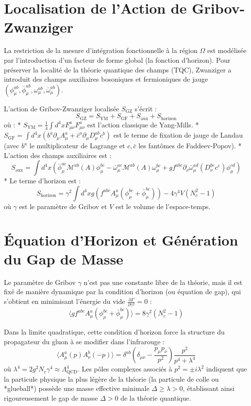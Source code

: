 \documentclass[11pt,a4paper]{article}
\begin{document}
\section{Localisation de l'Action de Gribov-Zwanziger}
La restriction de la mesure d'intégration fonctionnelle à la région $\Omega$ est modélisée par l'introduction d'un facteur de forme global (la fonction d'horizon). Pour préserver la localité de la théorie quantique des champs (TQC), Zwanziger a introduit des champs auxiliaires bosoniques et fermioniques de jauge $(\phi_\mu^{ab}, \bar{\phi}_\mu^{ab}, \omega_\mu^{ab}, \bar{\omega}_\mu^{ab})$.

L'action de Gribov-Zwanziger localisée $S_{\mathrm{GZ}}$ s'écrit :
$$ S_{\mathrm{GZ}} = S_{\mathrm{YM}} + S_{\mathrm{GF}} + S_{\mathrm{aux}} + S_{\mathrm{horizon}} $$
où :
* $S_{\mathrm{YM}} = \frac{1}{4} \int d^4x F_{\mu\nu}^a F_{\mu\nu}^a$ est l'action classique de Yang-Mills.
* $S_{\mathrm{GF}} = \int d^4x \left( b^a \partial_\mu A_\mu^a + \bar{c}^a \partial_\mu D_\mu^{ab} c^b \right)$ est le terme de fixation de jauge de Landau (avec $b^a$ le multiplicateur de Lagrange et $c, \bar{c}$ les fantômes de Faddeev-Popov).
* L'action des champs auxiliaires est :
  $$ S_{\mathrm{aux}} = \int d^4x \left( \bar{\phi}_{\mu}^{ac} \mathcal{M}^{ab}(A) \phi_{\mu}^{bc} - \bar{\omega}_{\mu}^{ac} \mathcal{M}^{ab}(A) \omega_{\mu}^{bc} + g f^{abc} \partial_\nu \bar{\omega}_{\mu}^{ad} (D_\nu^{be} c^e) \phi_{\mu}^{cd} \right) $$
* Le terme d'horizon est :
  $$ S_{\mathrm{horizon}} = \gamma^2 \int d^4x g \left( f^{abc} A_\mu^a (\phi_\mu^{bc} + \bar{\phi}_\mu^{bc}) \right) - 4\gamma^4 V (N_c^2 - 1) $$
  où $\gamma$ est le paramètre de Gribov et $V$ est le volume de l'espace-temps.

\section{Équation d'Horizon et Génération du Gap de Masse}
Le paramètre de Gribov $\gamma$ n'est pas une constante libre de la théorie, mais il est fixé de manière dynamique par la condition d'horizon (ou équation de gap), qui s'obtient en minimisant l'énergie du vide $\frac{\partial \Gamma}{\partial \gamma^2} = 0$ :
$$ \langle g f^{abc} A_\mu^a (\phi_\mu^{bc} + \bar{\phi}_\mu^{bc}) \rangle = 8 \gamma^2 (N_c^2 - 1) $$

Dans la limite quadratique, cette condition d'horizon force la structure du propagateur du gluon à se modifier dans l'infrarouge :
$$ \langle A_\mu^a(p) A_\nu^b(-p) \rangle = \delta^{ab} \left( \delta_{\mu\nu} - \frac{p_\mu p_\nu}{p^2} \right) \frac{p^2}{p^4 + \lambda^4} $$
où $\lambda^4 = 2 g^2 N_c \gamma^4 \approx \Lambda_{\mathrm{QCD}}^4$.
Les pôles complexes associés à $p^2 = \pm i \lambda^2$ indiquent que la particule physique la plus légère de la théorie (la particule de colle ou *glueball*) possède une masse effective minimale $\Delta \ge \lambda > 0$, établissant ainsi rigoureusement le gap de masse $\Delta > 0$ de la théorie quantique.
\end{document}
